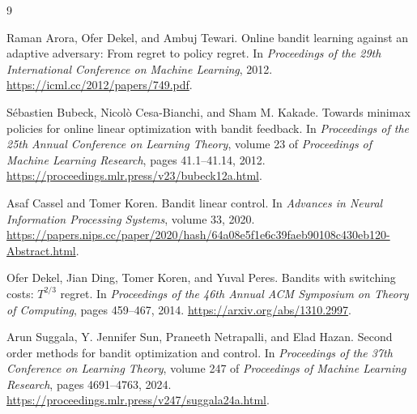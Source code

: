 \documentclass[11pt]{article}
\theoremstyle{definition}
\begin{document}
\begin{thebibliography}{9}

Raman Arora, Ofer Dekel, and Ambuj Tewari.
\newblock Online bandit learning against an adaptive adversary: From regret to policy regret.
\newblock In \emph{Proceedings of the 29th International Conference on Machine Learning}, 2012.
\newblock \url{https://icml.cc/2012/papers/749.pdf}.

S\'ebastien Bubeck, Nicol\`o Cesa-Bianchi, and Sham M. Kakade.
\newblock Towards minimax policies for online linear optimization with bandit feedback.
\newblock In \emph{Proceedings of the 25th Annual Conference on Learning Theory},
volume 23 of \emph{Proceedings of Machine Learning Research}, pages 41.1--41.14, 2012.
\newblock \url{https://proceedings.mlr.press/v23/bubeck12a.html}.

Asaf Cassel and Tomer Koren.
\newblock Bandit linear control.
\newblock In \emph{Advances in Neural Information Processing Systems}, volume 33, 2020.
\newblock \url{https://papers.nips.cc/paper/2020/hash/64a08e5f1e6c39faeb90108c430eb120-Abstract.html}.

Ofer Dekel, Jian Ding, Tomer Koren, and Yuval Peres.
\newblock Bandits with switching costs: $T^{2/3}$ regret.
\newblock In \emph{Proceedings of the 46th Annual ACM Symposium on Theory of Computing},
pages 459--467, 2014.
\newblock \url{https://arxiv.org/abs/1310.2997}.

Arun Suggala, Y. Jennifer Sun, Praneeth Netrapalli, and Elad Hazan.
\newblock Second order methods for bandit optimization and control.
\newblock In \emph{Proceedings of the 37th Conference on Learning Theory},
volume 247 of \emph{Proceedings of Machine Learning Research}, pages 4691--4763, 2024.
\newblock \url{https://proceedings.mlr.press/v247/suggala24a.html}.

\end{thebibliography}
\end{document}
